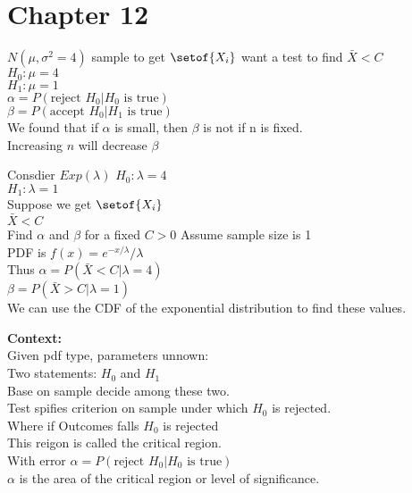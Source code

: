 \documentclass[answers,12pt,addpoints]{exam}
\begin{document}
\section*{Chapter 12}
\begin{example}
    $N( \mu , \sigma^2 = 4)$ sample to get $\setof{X_i}$ want a test to find $\bar{X} <C$\\
    $H_0: \mu = 4$\\
    $H_1: \mu = 1$\\
    $\alpha = P(\text{reject } H_0 | H_0 \text{ is true})$\\
    $\beta = P(\text{accept } H_0 | H_1 \text{ is true})$\\
    We found that if $\alpha$ is small, then $\beta$ is not if n is fixed. \\
    Increasing $n$ will decrease $\beta$\\
\end{example}
\begin{example}
    Consdier $Exp(\lambda)$ 
    $H_0: \lambda = 4$\\
    $H_1: \lambda = 1$\\
    Suppose we get $\setof{X_i}$\\
    $\bar{X} < C$\\
    Find $\alpha$ and $\beta$ for a fixed $C > 0$ Assume sample size is 1\\
    PDF is $f(x) =e^{-x/ \lambda} / \lambda $\\
    Thus $\alpha = P(\bar{X} < C | \lambda = 4)$\\
    $\beta = P(\bar{X} > C | \lambda = 1)$\\
    We can use the CDF of the exponential distribution to find these values.\\
    
\end{example}
\textbf{Context:}\\
Given pdf type, parameters unnown: \\
Two statements: $H_0$ and $H_1$\\
Base on sample decide among these two.\\
Test spifies criterion on sample under which $H_0$ is rejected.\\
Where if Outcomes falls $H_0$ is rejected\\
This reigon is called the critical region.\\
With error $\alpha = P(\text{reject } H_0 | H_0 \text{ is true})$\\
$\alpha$ is the area of the critical region or level of significance.\\
\end{document}
